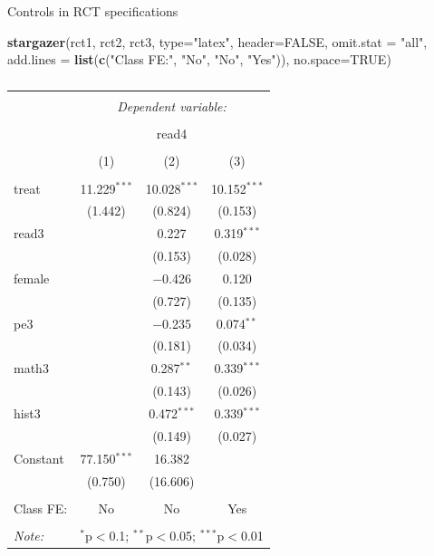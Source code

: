 \documentclass[
  ignorenonframetext,
]{beamer}
\newenvironment{Shaded}{\begin{snugshade}}{\end{snugshade}}
\newcommand{\DataTypeTok}[1]{\textcolor[rgb]{0.13,0.29,0.53}{#1}}
\newcommand{\KeywordTok}[1]{\textcolor[rgb]{0.13,0.29,0.53}{\textbf{#1}}}
\newcommand{\NormalTok}[1]{#1}
\newcommand{\OtherTok}[1]{\textcolor[rgb]{0.56,0.35,0.01}{#1}}
\newcommand{\StringTok}[1]{\textcolor[rgb]{0.31,0.60,0.02}{#1}}
\begin{document}
\begin{frame}[fragile]{Controls in RCT specifications}
\protect\hypertarget{controls-in-rct-specifications-3}{}
\tiny

\begin{Shaded}
\begin{Highlighting}[]
\KeywordTok{stargazer}\NormalTok{(rct1, rct2, rct3, }\DataTypeTok{type=}\StringTok{"latex"}\NormalTok{, }\DataTypeTok{header=}\OtherTok{FALSE}\NormalTok{, }\DataTypeTok{omit.stat =} \StringTok{"all"}\NormalTok{,}
                 \DataTypeTok{add.lines =} \KeywordTok{list}\NormalTok{(}\KeywordTok{c}\NormalTok{(}\StringTok{"Class FE:"}\NormalTok{, }\StringTok{"No"}\NormalTok{, }\StringTok{"No"}\NormalTok{, }\StringTok{"Yes"}\NormalTok{)),}
          \DataTypeTok{no.space=}\OtherTok{TRUE}\NormalTok{)}
\end{Highlighting}
\end{Shaded}

\begin{table}[!htbp] \centering 
  \caption{} 
  \label{} 
\begin{tabular}{@{\extracolsep{5pt}}lccc} 
\\[-1.8ex]\hline 
\hline \\[-1.8ex] 
 & \multicolumn{3}{c}{\textit{Dependent variable:}} \\ 
\cline{2-4} 
\\[-1.8ex] & \multicolumn{3}{c}{read4} \\ 
\\[-1.8ex] & (1) & (2) & (3)\\ 
\hline \\[-1.8ex] 
 treat & 11.229$^{***}$ & 10.028$^{***}$ & 10.152$^{***}$ \\ 
  & (1.442) & (0.824) & (0.153) \\ 
  read3 &  & 0.227 & 0.319$^{***}$ \\ 
  &  & (0.153) & (0.028) \\ 
  female &  & $-$0.426 & 0.120 \\ 
  &  & (0.727) & (0.135) \\ 
  pe3 &  & $-$0.235 & 0.074$^{**}$ \\ 
  &  & (0.181) & (0.034) \\ 
  math3 &  & 0.287$^{**}$ & 0.339$^{***}$ \\ 
  &  & (0.143) & (0.026) \\ 
  hist3 &  & 0.472$^{***}$ & 0.339$^{***}$ \\ 
  &  & (0.149) & (0.027) \\ 
  Constant & 77.150$^{***}$ & 16.382 &  \\ 
  & (0.750) & (16.606) &  \\ 
 \hline \\[-1.8ex] 
Class FE: & No & No & Yes \\ 
\hline 
\hline \\[-1.8ex] 
\textit{Note:}  & \multicolumn{3}{r}{$^{*}$p$<$0.1; $^{**}$p$<$0.05; $^{***}$p$<$0.01} \\ 
\end{tabular} 
\end{table}
\end{frame}
\end{document}
